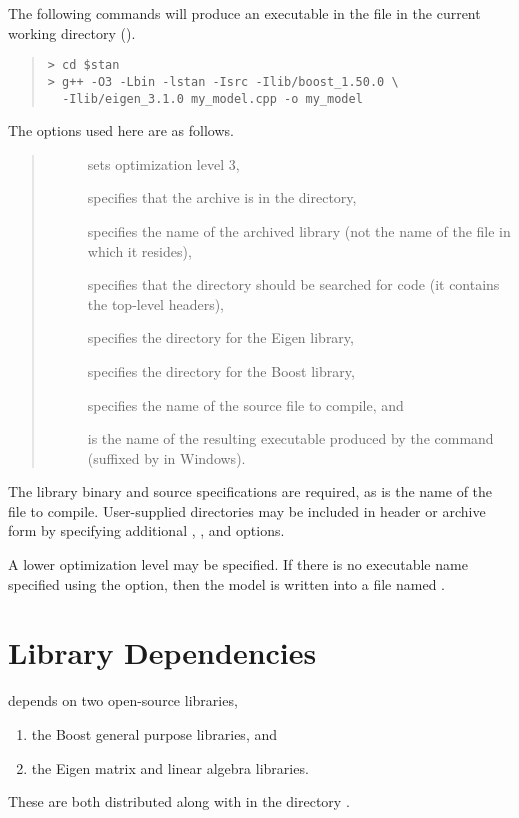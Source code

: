 The following commands will produce an executable in the file
 in the current working directory ().
%
\begin{quote}
\begin{Verbatim}[fontshape=sl]
> cd $stan
> g++ -O3 -Lbin -lstan -Isrc -Ilib/boost_1.50.0 \
  -Ilib/eigen_3.1.0 my_model.cpp -o my_model
\end{Verbatim}
\end{quote} %
%
The options used here are as follows.
\begin{quote}
\begin{description}
\item[] sets optimization level 3,
\item[] specifies that the archive is in the 
  directory,
\item[] specifies the name of the archived library (not
  the name of the file in which it resides),
\item[] specifies that the directory  should be
  searched for code (it contains the top-level \Stan headers),
\item[] specifies the directory for
  the Eigen library,
\item[] specifies the directory for the 
  Boost library,
\item[] specifies the name of the source file to
  compile, and 
\item[] is the name of the resulting executable
  produced by the command (suffixed by \code{.exe} in Windows).
\end{description}
\end{quote}
%
The library binary and source specifications are required, as is the
name of the \Cpp file to compile.  User-supplied directories may be
included in header or archive form by specifying additional ,
\code{-l}, and \code{-I} options.
 
A lower optimization level may be specified.  If there is no
executable name specified using the  option, then the model
is written into a file named \code{a.out}.
 

\section{Library Dependencies}

\Stan depends on two open-source libraries,
%
\begin{enumerate}
\item the Boost general purpose \Cpp libraries, and 
\item the Eigen matrix and linear algebra \Cpp libraries.
\end{enumerate}
%
These are both distributed along with \Stan in the directory
.  

